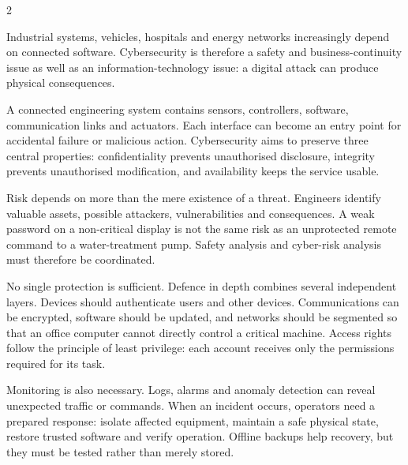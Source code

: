 

\begin{multicols}{2}
\begin{engineeringnews}
Industrial systems, vehicles, hospitals and energy networks increasingly depend on connected
software. Cybersecurity is therefore a safety and business-continuity issue as well as an information-technology
issue: a digital attack can produce physical consequences.
\end{engineeringnews}

\begin{ecarticle}
A connected engineering system contains sensors, controllers, software, communication links and
actuators. Each interface can become an entry point for accidental failure or malicious action.
Cybersecurity aims to preserve three central properties: confidentiality prevents unauthorised
disclosure, integrity prevents unauthorised modification, and availability keeps the service usable.

Risk depends on more than the mere existence of a threat. Engineers identify valuable assets, possible
attackers, vulnerabilities and consequences. A weak password on a non-critical display is not the
same risk as an unprotected remote command to a water-treatment pump. Safety analysis and cyber-risk
analysis must therefore be coordinated.

No single protection is sufficient. Defence in depth combines several independent layers. Devices
should authenticate users and other devices. Communications can be encrypted, software should be
updated, and networks should be segmented so that an office computer cannot directly control a
critical machine. Access rights follow the principle of least privilege: each account receives only
the permissions required for its task.

Monitoring is also necessary. Logs, alarms and anomaly detection can reveal unexpected traffic or
commands. When an incident occurs, operators need a prepared response: isolate affected equipment,
maintain a safe physical state, restore trusted software and verify operation. Offline backups help
recovery, but they must be tested rather than merely stored.


\end{ecarticle}
\end{multicols}

